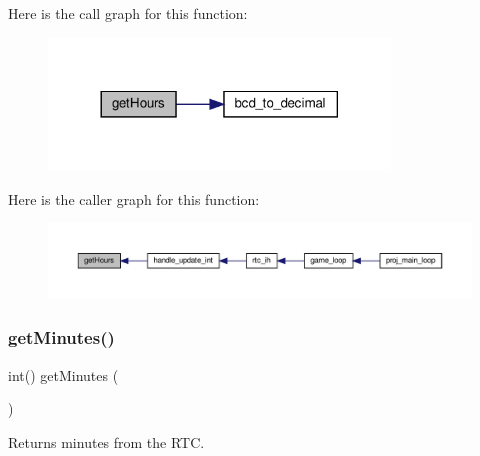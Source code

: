 Here is the call graph for this function\+:
\nopagebreak
\begin{figure}[H]
\begin{center}
\leavevmode
\includegraphics[width=257pt]{group__rtc_ga51db428cbafeba59111359b236ed248a_cgraph}
\end{center}
\end{figure}
Here is the caller graph for this function\+:
\nopagebreak
\begin{figure}[H]
\begin{center}
\leavevmode
\includegraphics[width=350pt]{group__rtc_ga51db428cbafeba59111359b236ed248a_icgraph}
\end{center}
\end{figure}
\mbox{\label{group__rtc_gad64e3c6015d2b7c99c50817798309d52}} 
\subsubsection{\texorpdfstring{get\+Minutes()}{getMinutes()}}
{\footnotesize\ttfamily int() get\+Minutes (\begin{DoxyParamCaption}{ }\end{DoxyParamCaption})}



Returns minutes from the R\+TC. 

